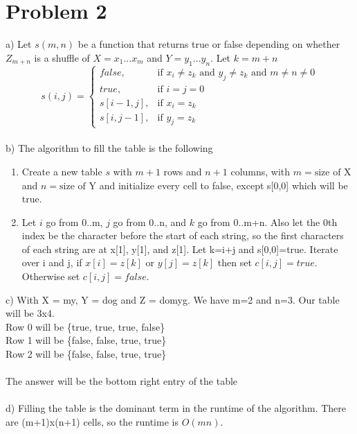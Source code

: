 \documentclass{article}
\begin{document}
\section*{Problem 2}
a) Let $s(m,n)$ be a function that returns true or false depending on whether $Z_{m+n}$ is a shuffle of $X = x_1 ... x_m$ and $Y = y_1 ... y_n$.  Let $k=m+n$
\[
    s(i,j)= 
\begin{cases}
    false,& \text{if } x_i\neq z_k \text{ and } y_j\neq z_k \text{ and } m\neq n\neq 0\\
    true,& \text{if } i=j=0\\
    s[i-1, j],& \text{if } x_i=z_k\\
    s[i, j-1],& \text{if } y_j=z_k
\end{cases}
\]\\
b) The algorithm to fill the table is the following
\begin{enumerate}
  \item Create a new table $s$ with $m+1$ rows and $n+1$ columns, with $m=\text{size of X}$ and $n=\text{size of Y}$ and initialize every cell to false, except s[0,0] which will be true.
  \item Let $i$ go from 0..m, $j$ go from 0..n, and $k$ go from 0..m+n. Also let the 0th index be the character before the start of each string, so the first characters of each string are at x[1], y[1], and z[1]. Let k=i+j and s[0,0]=true. Iterate over i and j, if $x[i]=z[k]$ or $y[j]=z[k]$ then set $c[i,j]=true$. Otherwise set $c[i,j]=false$.
\end{enumerate}
c) With X = my, Y = dog and Z = domyg. We have m=2 and n=3.  Our table will be 3x4.\\
Row 0 will be \{true, true, true, false\}\\
Row 1 will be \{false, false, true, true\}\\
Row 2 will be \{false, false, true, true\}\\\\
The answer will be the bottom right entry of the table\\\\
d) Filling the table is the dominant term in the runtime of the algorithm.  There are (m+1)x(n+1) cells, so the runtime is $O(mn)$.\\
\end{document}
